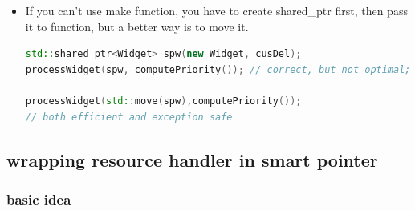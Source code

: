 \documentclass[a4paper,12pt,twoside]{book}
\begin{document}
\begin{itemize}
	\item If you can't use make function, you have to create shared\_ptr first, then pass it to function, but a better way is to move it.
\begin{lstlisting}[frame=single, language=c++]
std::shared_ptr<Widget> spw(new Widget, cusDel);
processWidget(spw, computePriority()); // correct, but not optimal; see below

processWidget(std::move(spw),computePriority());  
// both efficient and exception safe
\end{lstlisting}
	
\end{itemize}

\subsection{wrapping resource handler in smart pointer}

\subsubsection{basic idea}
\end{document}

